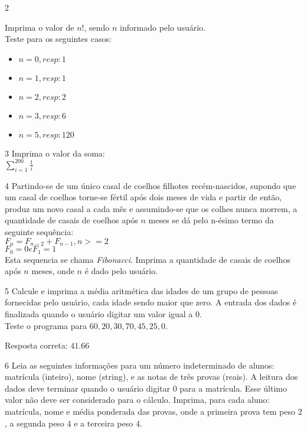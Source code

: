 \begin{exercicio}
  {2}
  {Imprima o valor de $n!$, sendo $n$ informado pelo usuário. \\
  Teste para os seguintes casos: \\
  \begin{itemize}
    \item $n = 0, resp: 1$
    \item $n = 1, resp: 1$
    \item $n = 2, resp: 2$
    \item $n = 3, resp: 6$
    \item $n = 5, resp: 120$
  \end{itemize}}
\end{exercicio}

\begin{exercicio}
  {3}
  {Imprima o valor da soma: \\
  $\sum\limits_{i=1}^{200} \frac{1}{i}$}
\end{exercicio}

\begin{exercicio}
  {4}
  {Partindo-se de um único casal de coelhos filhotes recém-nascidos, supondo que um casal de coelhos torne-se fértil após dois meses de vida e partir de então, produz um novo casal a cada mês e assumindo-se que os colhes nunca morrem, a quantidade de casais de coelhos após $n$ meses se dá pelo n-ésimo termo da seguinte sequência: \\
  $F_{n} = F_{n-2} + F_{n-1}, n>=2$ \\
  $F_{0} = 0  e F_{1} = 1$ \\
  Esta sequencia se chama \textit{Fibonacci}. Imprima a quantidade de casais de coelhos após $n$ meses, onde $n$ é dado pelo usuário.}
\end{exercicio}

\begin{exercicio}
  {5}
  {Calcule e imprima a média aritmética das idades de um grupo de pessoas fornecidas pelo usuário, cada idade sendo maior que zero. A entrada dos dados é finalizada quando o usuário digitar um valor igual a $0$. \\
  Teste o programa para $60,20,30,70,45,25,0$.}

  Resposta correta: $41.66$
\end{exercicio}

\begin{exercicio}
  {6}
  {Leia as seguintes informações para um número indeterminado de alunos: matrícula (inteiro), nome (string), e as notas de três provas (reais). A leitura dos dados deve terminar quando o usuário digitar $0$ para a matrícula. Esse último valor não deve ser considerado para o cálculo. Imprima, para cada aluno: matrícula, nome e média ponderada das provas, onde a primeira prova tem peso $2$, a segunda peso $4$ e a terceira peso $4$.}
\end{exercicio}

